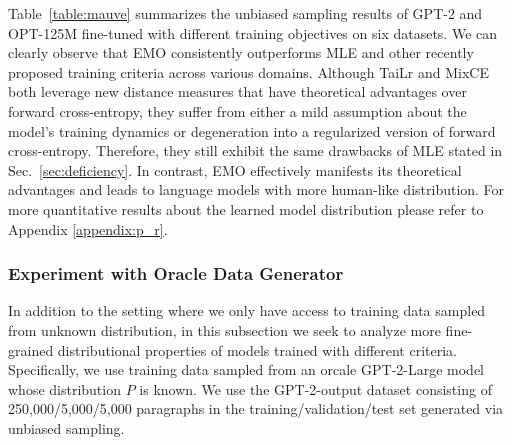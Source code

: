 Table~\ref{table:mauve} summarizes the unbiased sampling results of GPT-2 and OPT-125M fine-tuned with different training objectives on six datasets. We can clearly observe that EMO consistently 
outperforms MLE and other recently proposed training criteria across various domains. Although TaiLr and MixCE both leverage new distance measures that have theoretical advantages over forward cross-entropy, they suffer from either a mild assumption about the model's training dynamics or degeneration into a regularized version of forward cross-entropy. Therefore, they still exhibit the same drawbacks of MLE stated in Sec.~\ref{sec:deficiency}. 
In contrast, EMO effectively manifests its theoretical advantages and leads to language models with more human-like distribution. For more quantitative results about the learned model distribution please refer to Appendix \ref{appendix:p_r}.
\subsubsection{Experiment with Oracle Data Generator}
In addition to the setting where we only have access to training data sampled from unknown distribution, in this subsection we seek to analyze more fine-grained distributional properties of models trained with different criteria. Specifically, we 
use training data sampled from an orcale GPT-2-Large model whose distribution $P$ is known. We use the GPT-2-output dataset consisting of 250,000/5,000/5,000 paragraphs in the training/validation/test set generated via unbiased sampling.
